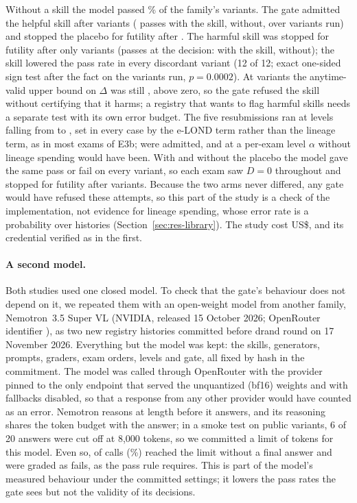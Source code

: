 Without a skill the model passed \NLsBBasePct\% of the family's variants. The gate admitted the helpful skill after \NLsBHelpN{} variants (\NLsBHelpWith{} passes with the skill, \NLsBHelpWithout{} without, over \NLsBHelpRun{} variants run) and stopped the placebo for futility after \NLsBPlacN. The harmful skill was stopped for futility after only \NLsBHarmN{} variants (passes at the decision: \NLsBHarmTauWith{} with the skill, \NLsBHarmTauWithout{} without); the skill lowered the pass rate in every discordant variant (12 of 12; exact one-sided sign test after the fact on the \NLsBHarmRun{} variants run, $p=0.0002$). At \NLsBHarmN{} variants the anytime-valid upper bound on $\Delta$ was still \NLsBHarmUcb, above zero, so the gate refused the skill without certifying that it harms; a registry that wants to flag harmful skills needs a separate test with its own error budget. The five resubmissions ran at levels falling from \NLsResubLevelFirst{} to \NLsResubLevelLast{}, set in every case by the e-LOND term rather than the lineage term, as in most exams of E3b; \NLsResubAdmit{} were admitted, and at a per-exam level $\alpha$ without lineage spending \NLsResubAdmitPer{} would have been. With and without the placebo the model gave the same pass or fail on every variant, so each exam saw $D=0$ throughout and stopped for futility after \NLsResubNmin{} variants. Because the two arms never differed, any gate would have refused these attempts, so this part of the study is a check of the implementation, not evidence for lineage spending, whose error rate is a probability over histories (Section~\ref{sec:res-library}). The study cost US\$\NLsThreeCost, and its credential verified as in the first.

\paragraph{A second model.} Both studies used one closed model. To check that the gate's behaviour does not depend on it, we repeated them with an open-weight model from another family, Nemotron~3.5 Super VL (NVIDIA, released 15 October 2026; OpenRouter identifier \texttt{\NLnModel}), as two new registry histories committed before drand round \NLnRound{} on 17 November 2026. Everything but the model was kept: the skills, generators, prompts, graders, exam orders, levels and gate, all fixed by hash in the commitment. The model was called through OpenRouter with the provider pinned to the only endpoint that served the unquantized (bf16) weights and with fallbacks disabled, so that a response from any other provider would have counted as an error. Nemotron reasons at length before it answers, and its reasoning shares the token budget with the answer; in a smoke test on public variants, 6 of 20 answers were cut off at 8,000 tokens, so we committed a limit of \NLnMaxTok{} tokens for this model. Even so, \NLnCut{} of \NLnCalls{} calls (\NLnCutPct\%) reached the limit without a final answer and were graded as fails, as the pass rule requires. This is part of the model's measured behaviour under the committed settings; it lowers the pass rates the gate sees but not the validity of its decisions.

